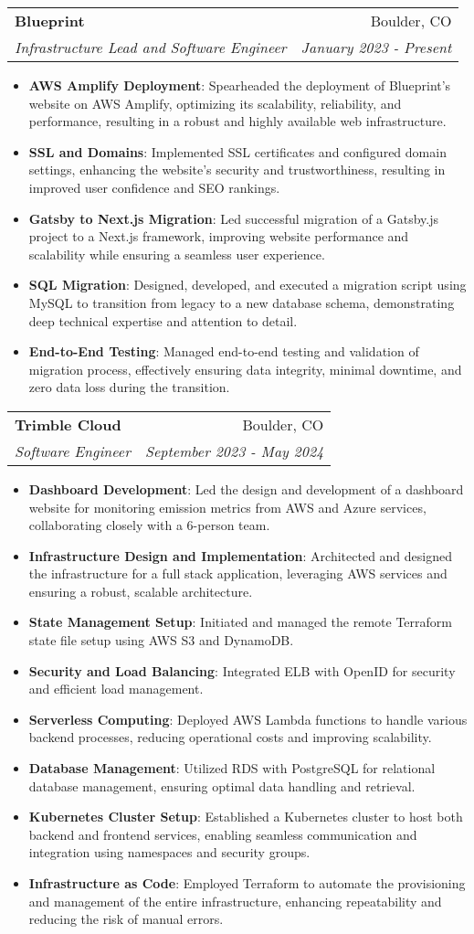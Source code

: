 \documentclass[letterpaper,11pt]{article}
\makeatletter
\newcommand{\resumeItem}[2]{
  \item\small{
    \textbf{#1}{: #2 \vspace{-2pt}}
  }
}
\newcommand{\resumeSubheading}[4]{
  \vspace{-1pt}\item
    \begin{tabular*}{0.97\textwidth}[t]{l@{\extracolsep{\fill}}r}
      \textbf{#1} & #2\vspace{-2pt} \\
      \textit{\small#3} & \textit{\small #4} \\
    \end{tabular*}\vspace{-8pt}
}
\newcommand{\resumeItemListStart}{\begin{itemize}}
\newcommand{\resumeItemListEnd}{\end{itemize}\vspace{-8pt}}
\makeatother
\begin{document}
\resumeSubheading
{Blueprint}{Boulder, CO}
{Infrastructure Lead and Software Engineer}{January 2023 - Present}
\resumeItemListStart
\resumeItem{AWS Amplify Deployment}
{Spearheaded the deployment of Blueprint's website on AWS Amplify, optimizing its scalability, reliability, and performance, resulting in a robust and highly available web infrastructure.}
\resumeItem{SSL and Domains}
{Implemented SSL certificates and configured domain settings, enhancing the website's security and trustworthiness, resulting in improved user confidence and SEO rankings.}
\resumeItem{Gatsby to Next.js Migration}
{Led successful migration of a Gatsby.js project to a Next.js framework, improving website performance and scalability while ensuring a seamless user experience.}
\resumeItem{SQL Migration}
{Designed, developed, and executed a migration script using MySQL to transition from legacy to a new database schema, demonstrating deep technical expertise and attention to detail.}
\resumeItem{End-to-End Testing}
{Managed end-to-end testing and validation of migration process, effectively ensuring data integrity, minimal downtime, and zero data loss during the transition.}
\resumeItemListEnd

\resumeSubheading
{Trimble Cloud }{Boulder, CO}
{Software Engineer}{September 2023 - May 2024}
\resumeItemListStart
\resumeItem{Dashboard Development}
{Led the design and development of a dashboard website for monitoring emission metrics from AWS and Azure services, collaborating closely with a 6-person team.}
\resumeItem{Infrastructure Design and Implementation}
{Architected and designed the infrastructure for a full stack application, leveraging AWS services and ensuring a robust, scalable architecture.}
\resumeItem{State Management Setup}
{Initiated and managed the remote Terraform state file setup using AWS S3 and DynamoDB.}
\resumeItem{Security and Load Balancing}{Integrated ELB with OpenID for security and efficient load management.}
\resumeItem{Serverless Computing}{Deployed AWS Lambda functions to handle various backend processes, reducing operational costs and improving scalability.}
\resumeItem{Database Management}{Utilized RDS with PostgreSQL for relational database management, ensuring optimal data handling and retrieval.}
\resumeItem{Kubernetes Cluster Setup}
{Established a Kubernetes cluster to host both backend and frontend services, enabling seamless communication and integration using namespaces and security groups.}
\resumeItem{Infrastructure as Code}
{Employed Terraform to automate the provisioning and management of the entire infrastructure, enhancing repeatability and reducing the risk of manual errors.}
\resumeItemListEnd
\end{document}
